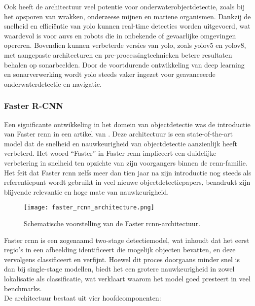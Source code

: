 Ook heeft de architectuur veel potentie voor onderwaterobjectdetectie, zoals bij het opsporen van wrakken, onderzeese mijnen en mariene organismen. Dankzij de snelheid en efficiëntie van \gls{yolo} kunnen real-time detecties worden uitgevoerd, wat waardevol is voor \glspl{auv} en robots die in onbekende of gevaarlijke omgevingen opereren. Bovendien kunnen verbeterde versies van \gls{yolo}, zoals \gls{yolo}v5 en \gls{yolo}v8, met aangepaste architecturen en pre-processingtechnieken betere resultaten behalen op sonarbeelden. Door de voortdurende ontwikkeling van deep learning en sonarverwerking wordt \gls{yolo} steeds vaker ingezet voor geavanceerde onderwaterdetectie en navigatie. \autocite{Chen_2023}

\subsubsection{Faster R-CNN}

Een significante ontwikkeling in het domein van objectdetectie was de introductie van Faster \gls{rcnn} in een artikel van \textcite{Ren_2015}. Deze architectuur is een state-of-the-art model dat de snelheid en nauwkeurigheid van objectdetectie aanzienlijk heeft verbeterd. Het woord ``Faster'' in Faster \gls{rcnn} impliceert een duidelijke verbetering in snelheid ten opzichte van zijn voorgangers binnen de \gls{rcnn}-familie. Het feit dat Faster \gls{rcnn} zelfs meer dan tien jaar na zijn introductie nog steeds als referentiepunt wordt gebruikt in veel nieuwe objectdetectiepapers, benadrukt zijn blijvende relevantie en hoge mate van nauwkeurigheid.

\begin{figure}[H]
    \centering
    \texttt{[image: faster\_rcnn\_architecture.png]}
    \caption[Faster R-CNN-architectuur.]{\label{fig:faster_rcnn_architecture}Schematische voorstelling van de Faster \gls{rcnn}-architectuur. \autocite{Ren_2015}}
\end{figure}

Faster \gls{rcnn} is een zogenaamd two-stage detectiemodel, wat inhoudt dat het eerst regio’s in een afbeelding identificeert die mogelijk objecten bevatten, en deze vervolgens classificeert en verfijnt. Hoewel dit proces doorgaans minder snel is dan bij single-stage modellen, biedt het een grotere nauwkeurigheid in zowel lokalisatie als classificatie, wat verklaart waarom het model goed presteert in veel benchmarks. \\

De architectuur bestaat uit vier hoofdcomponenten:

